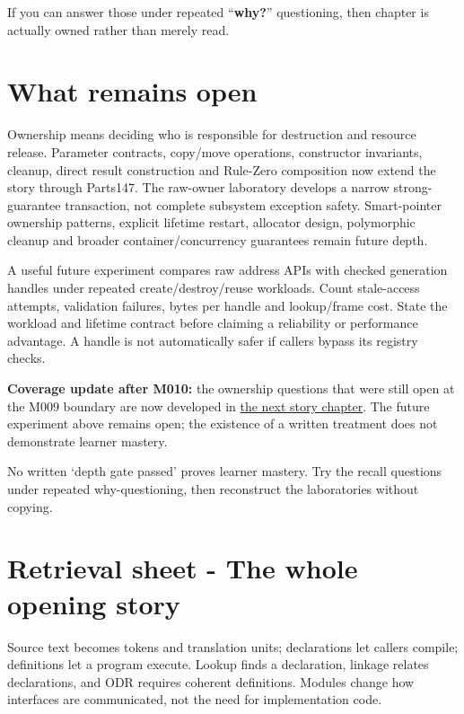 If you can answer those under repeated ``\textbf{why?}'' questioning, then chapter is actually owned rather than merely read.

\section{What remains open}\label{01-foundations-i-ch004-what-remains-open}

\hypertarget{01-foundations-i-ch004-what-remains-open}{}

Ownership means deciding who is responsible for destruction and resource release. Parameter contracts, copy/move operations, constructor invariants, cleanup, direct result construction and Rule-Zero composition now extend the story through Parts147. The raw-owner laboratory develops a narrow strong-guarantee transaction, not complete subsystem exception safety. Smart-pointer ownership patterns, explicit lifetime restart, allocator design, polymorphic cleanup and broader container/concurrency guarantees remain future depth.

A useful future experiment compares raw address APIs with checked generation handles under repeated create/destroy/reuse workloads. Count stale-access attempts, validation failures, bytes per handle and lookup/frame cost. State the workload and lifetime contract before claiming a reliability or performance advantage. A handle is not automatically safer if callers bypass its registry checks.

\textbf{Coverage update after M010:} the ownership questions that were still open at the M009 boundary are now developed in \hyperref[01-foundations-i-ch004-from-a-live-object-to-responsible-resource-ownership]{the next story chapter}. The future experiment above remains open; the existence of a written treatment does not demonstrate learner mastery.

No written `depth gate passed' proves learner mastery. Try the recall questions under repeated why-questioning, then reconstruct the laboratories without copying.

\section{Retrieval sheet - The whole opening story}\label{01-foundations-i-ch004-retrieval-sheet---the-whole-opening-story}

\hypertarget{01-foundations-i-ch004-retrieval-sheet---the-whole-opening-story}{}

Source text becomes tokens and translation units; declarations let callers compile; definitions let a program execute. Lookup finds a declaration, linkage relates declarations, and ODR requires coherent definitions. Modules change how interfaces are communicated, not the need for implementation code.

